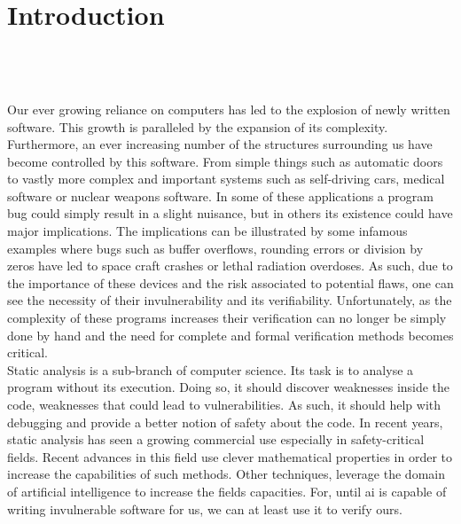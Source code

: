 
\setcounter{chapter}{0}

\chapter{Introduction}
\mbox{}\\
\mbox{}\\
\mbox{}\\
Our ever growing reliance on computers has led to the explosion of newly written software. This growth is paralleled by the expansion of its complexity. Furthermore, an ever increasing number of the structures surrounding us have become controlled by this software. From simple things such as automatic doors to vastly more complex and important systems such as self-driving cars, medical software or nuclear weapons software. In some of these applications a program bug could simply result in a slight nuisance, but in others its existence could have major implications. The implications can be illustrated by some infamous examples where bugs such as buffer overflows, rounding errors or division by zeros have led to space craft crashes or lethal radiation overdoses. As such, due to the importance of these devices and the risk associated to potential flaws, one can see the necessity of their invulnerability and its verifiability. Unfortunately, as the complexity of these programs increases their verification can no longer be simply done by hand and the need for complete and formal verification methods becomes critical.\\
Static analysis is a sub-branch of computer science. Its task is to analyse a program without its execution. Doing so, it should discover weaknesses inside the code, weaknesses that could lead to vulnerabilities. As such, it should help with debugging and provide a better notion of safety about the code. In recent years, static analysis has seen a growing commercial use especially in safety-critical fields. Recent advances in this field use clever mathematical properties in order to increase the capabilities of such methods. Other techniques, leverage the domain of artificial intelligence to increase the fields capacities. For, until ai is capable of writing invulnerable software for us, we can at least use it to verify ours.
